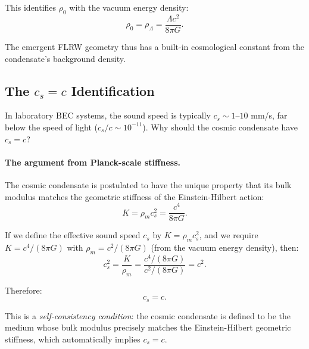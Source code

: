This identifies $\rho_0$ with the vacuum energy density:
\begin{equation}
\rho_0 = \rho_\Lambda = \frac{\Lambda c^2}{8\pi G}.
\end{equation}

The emergent FLRW geometry thus has a built-in cosmological constant from the condensate's background density.

\subsection{The $c_s = c$ Identification}
\label{sec:cs_equals_c}

In laboratory BEC systems, the sound speed is typically $c_s \sim 1$--$10$ mm/s, far below the speed of light ($c_s/c \sim 10^{-11}$). Why should the cosmic condensate have $c_s = c$?

\paragraph{The argument from Planck-scale stiffness.}
The cosmic condensate is postulated to have the unique property that its bulk modulus matches the geometric stiffness of the Einstein-Hilbert action:
\begin{equation}
\label{eq:stiffness_match_repeat}
K = \rho_m c_s^2 = \frac{c^4}{8\pi G}.
\end{equation}

If we define the effective sound speed $c_s$ by $K = \rho_m c_s^2$, and we require $K = c^4/(8\pi G)$ with $\rho_m = c^2/(8\pi G)$ (from the vacuum energy density), then:
\begin{equation}
c_s^2 = \frac{K}{\rho_m} = \frac{c^4/(8\pi G)}{c^2/(8\pi G)} = c^2.
\end{equation}

Therefore:
\begin{equation}
\label{eq:cs_equals_c}
\boxed{c_s = c.}
\end{equation}

This is a \emph{self-consistency condition}: the cosmic condensate is defined to be the medium whose bulk modulus precisely matches the Einstein-Hilbert geometric stiffness, which automatically implies $c_s = c$.

